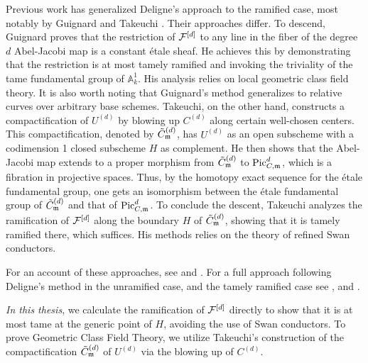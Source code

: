 Previous work has generalized Deligne's approach to the ramified case, 
most notably by Guignard \cite{Guignard2018} and Takeuchi \cite{takeuchi2019blow}. 
Their approaches differ. 
To descend, Guignard proves that the restriction of $\cF^{[d]}$ to any line in the fiber of the degree $d$ Abel-Jacobi map is a constant 
étale sheaf. He achieves this by demonstrating that the restriction is at most tamely ramified and invoking the triviality of the tame fundamental group 
of $\mathbb{A}^1_k$. His analysis relies on local geometric class field theory. 
It is also worth noting that Guignard's method generalizes to relative curves over arbitrary base schemes.
Takeuchi, on the other hand, constructs a compactification of $U^{(d)}$ by blowing up $C^{(d)}$ along certain well-chosen centers.
This compactification, denoted by $\tilde{C}^{(d)}_\mdls$, has $U^{(d)}$ as an open subscheme with a codimension 1 closed subscheme $H$ as complement. 
He then shows that the Abel-Jacobi map extends to a proper morphism from $\tilde{C}^{(d)}_\mdls$ to $\PicCm[d]$,
which is a fibration in projective spaces. Thus, by the homotopy exact sequence for the \'etale fundamental group, one gets an isomorphism between the \'etale fundamental group of
$\tilde{C}^{(d)}_\mdls$ and that of $\PicCm[d]$. To conclude the descent, Takeuchi analyzes the ramification of $\cF^{[d]}$ along the boundary $H$ of $\tilde{C}^{(d)}_\mdls$,
showing that it is tamely ramified there, which suffices. His methods relies on the theory of refined Swan conductors.

For an account of these approaches, see \cite{Guignard2018} and \cite{takeuchi2019blow}.
For a full approach following Deligne's method in the unramified case, and the tamely ramified case see \cite{tendler2015geometricclassfieldtheory}, and \cite{Toth2011}.

\textit{In this thesis}, we calculate the ramification of $\cF^{[d]}$ 
directly to show that it is at most tame at the generic point of $H$, 
avoiding the use of Swan conductors. 
To prove Geometric Class Field Theory, 
we utilize Takeuchi's construction of the compactification $\tilde{C}^{(d)}_\mdls$ 
of $U^{(d)}$ via the blowing up of $C^{(d)}$.


